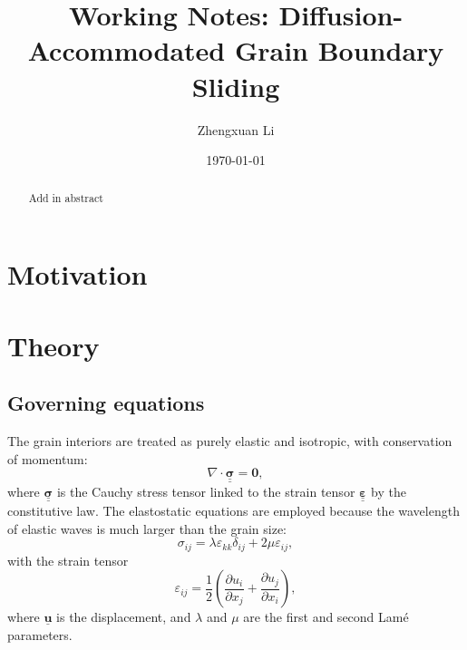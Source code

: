 \documentclass[12pt]{article}
\title{Working Notes: Diffusion-Accommodated Grain Boundary Sliding}
\author{Zhengxuan Li}
\date{\today}
\newcommand{\Grad}{\nabla}
\newcommand{\Div}{\Grad\cdot}
\newcommand{\pd}[2]{\frac{\partial{#1}}{\partial{#2}}}
\newcommand{\tensor}[1]{\underline{\underline{\boldsymbol{#1}}}}
\newcommand{\vect}[1]{\underline{\boldsymbol{#1}}}
\begin{document}
\maketitle

\begin{abstract}
Add in abstract
\end{abstract}

\tableofcontents
\newpage

\section{Motivation}


\section{Theory}

\subsection{Governing equations}

The grain interiors are treated as purely elastic and isotropic, with conservation of momentum:
\begin{equation}
    \Div \tensor{\sigma} = \boldsymbol{0}, \label{eq:conservation of momentum}
\end{equation}
where $\tensor{\sigma}$ is the Cauchy stress tensor linked to the strain tensor $\tensor{\varepsilon}$ by the constitutive law.
The elastostatic equations are employed because the wavelength of elastic waves is much larger than the grain size:
\begin{equation}
    \sigma_{ij} = \lambda \varepsilon_{kk} \delta_{ij} + 2\mu \varepsilon_{ij}, \label{eq:elastic constitutive law}
\end{equation}
with the strain tensor
\begin{equation}
    \varepsilon_{ij} = \frac{1}{2}\left(\pd{u_i}{x_j} + \pd{u_j}{x_i}\right), \label{eq:strain tensor}
\end{equation}
where $\vect{u}$ is the displacement, and $\lambda$ and $\mu$ are the first and second Lam\'e parameters.
\end{document}
